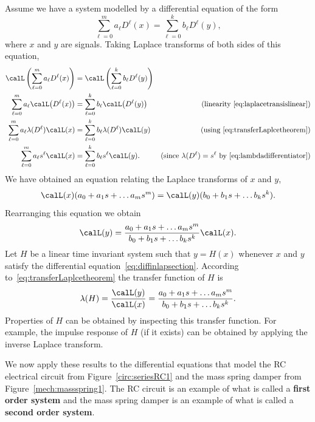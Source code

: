 \documentclass[11pt,a4paper]{book}
\theoremstyle{plain}
\numberwithin{equation}{section}
\newcommand{\term}{\textbf}
\begin{document}
Assume we have a system modelled by a differential equation of the form
\begin{equation}\label{eq:diffinlapsection}
\sum_{\ell=0}^{m} a_\ell D^\ell(x) = \sum_{\ell=0}^{k} b_\ell D^\ell(y),
\end{equation}
where $x$ and $y$ are signals.  Taking Laplace transforms of both sides of this equation,
\begin{align*}
\calL\left( \sum_{\ell=0}^{m} a_\ell D^\ell(x) \right) &= \calL\left( \sum_{\ell=0}^{k} b_\ell D^\ell(y) \right) & \\
\sum_{\ell=0}^{m} a_\ell \calL\big(D^\ell(x)\big) &= \sum_{\ell=0}^{k} b_\ell \calL\big(D^\ell(y)\big) & \text{(linearity~\eqref{eq:laplacetransislinear})} \\
\sum_{\ell=0}^{m} a_\ell \lambda(D^\ell) \calL(x) &= \sum_{\ell=0}^{k} b_\ell \lambda(D^\ell) \calL(y) & \text{(using \eqref{eq:transferLaplcetheorem})} \\
\sum_{\ell=0}^{m} a_\ell s^\ell \calL(x) &= \sum_{\ell=0}^{k} b_\ell s^\ell \calL(y). & \text{(since $\lambda(D^\ell) = s^\ell$ by~\eqref{eq:lambdadifferentiator})}
\end{align*}
We have obtained an equation relating the Laplace transforms of $x$ and $y$,
\[
\calL(x) (a_0 + a_1s + \dots a_m s^m) =  \calL(y) (b_0 + b_1s + \dots b_k s^k). 
\]
Rearranging this equation we obtain 
\[
\calL(y) = \frac{a_0 + a_1s + \dots a_m s^m}{b_0 + b_1s + \dots b_k s^k} \calL(x).
\]
Let $H$ be a linear time invariant system such that $y = H(x)$ whenever $x$ and $y$ satisfy the differential equation~\eqref{eq:diffinlapsection}.   According to~\eqref{eq:transferLaplcetheorem} the transfer function of $H$ is
\[
\lambda(H) = \frac{\calL(y)}{\calL(x)} = \frac{a_0 + a_1s + \dots a_m s^m}{b_0 + b_1s + \dots b_k s^k}.
\]
Properties of $H$ can be obtained by inspecting this transfer function.  For example, the impulse response of $H$ (if it exists) can be obtained by applying the inverse Laplace transform.

We now apply these results to the differential equations that model the RC electrical circuit from Figure~\ref{circ:seriesRC1} and the mass spring damper from Figure~\ref{mech:massspring1}.  The RC circuit is an example of what is called a \term{first order system} and the mass spring damper is an example of what is called a \term{second order system}.
\end{document}
